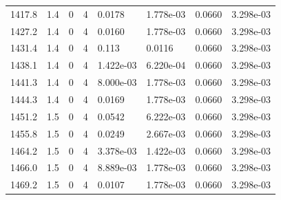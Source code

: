 \documentclass[preview]{standalone}
\begin{document}
{{{{{{{{\begin{tabular}{L{1.2cm}C{1.2cm} C{0.3cm}C{0.5cm} C{1.4cm}C{1.4cm} C{1.4cm}C{1.4cm}}
  1417.8  &   1.4  & 0     &  4 &  0.0178  & 1.778e-03  & 0.0660 &  3.298e-03   \\ 
  1427.2  &   1.4  & 0     &  4 &  0.0160  & 1.778e-03  & 0.0660 &  3.298e-03   \\ 
  1431.4  &   1.4  & 0     &  4 &  0.113  & 0.0116  & 0.0660 &  3.298e-03   \\ 
  1438.1  &   1.4  & 0     &  4 &  1.422e-03  & 6.220e-04  & 0.0660 &  3.298e-03   \\ 
  1441.3  &   1.4  & 0     &  4 &  8.000e-03  & 1.778e-03  & 0.0660 &  3.298e-03   \\ 
  1444.3  &   1.4  & 0     &  4 &  0.0169  & 1.778e-03  & 0.0660 &  3.298e-03   \\ 
  1451.2  &   1.5  & 0     &  4 &  0.0542  & 6.222e-03  & 0.0660 &  3.298e-03   \\ 
  1455.8  &   1.5  & 0     &  4 &  0.0249  & 2.667e-03  & 0.0660 &  3.298e-03   \\ 
  1464.2  &   1.5  & 0     &  4 &  3.378e-03  & 1.422e-03  & 0.0660 &  3.298e-03   \\ 
  1466.0  &   1.5  & 0     &  4 &  8.889e-03  & 1.778e-03  & 0.0660 &  3.298e-03   \\ 
  1469.2  &   1.5  & 0     &  4 &  0.0107  & 1.778e-03  & 0.0660 &  3.298e-03   \\ 
\hline 
\end{tabular} 

}}}}}}}}
\end{document}
